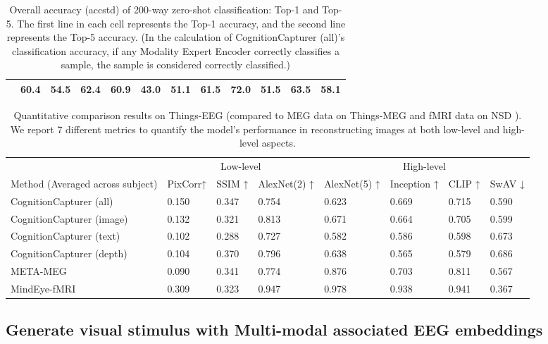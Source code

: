 \documentclass[letterpaper]{article} %
\begin{document}
\begin{table}[ht]
\begin{tabular}{c|ccccccccccc}
 & \textbf{60.4} & 54.5 & 62.4 & 60.9 & 43.0 & 51.1 & \textbf{61.5} & 72.0 & 51.5 & 63.5 & 58.1 \\ \hline
\end{tabular}
\caption{Overall accuracy (acc\textpm std) of 200-way zero-shot classification: Top-1 and Top-5. The first line in each cell represents the Top-1 accuracy, and the second line represents the Top-5 accuracy. (In the calculation of CognitionCapturer (all)'s classification accuracy, if any Modality Expert Encoder correctly classifies a sample, the sample is considered correctly classified.) }
\label{top15results}
\end{table}

\begin{table}[ht]
\centering
\setlength{\tabcolsep}{1mm}
\begin{tabular}{l|lllllll}
\hline
 & \multicolumn{3}{c|}{Low-level} & \multicolumn{4}{c}{High-level} \\ \cline{2-8} 
Method (Averaged across subject) & PixCorr↑ & SSIM ↑ & AlexNet(2) ↑ & AlexNet(5) ↑ & Inception ↑ & CLIP ↑ & SwAV ↓ \\ \hline
CognitionCapturer (all) & 0.150 & 0.347 & 0.754 & 0.623 & 0.669 & 0.715 & 0.590 \\
CognitionCapturer (image) & 0.132 & 0.321 & 0.813 & 0.671 & 0.664 & 0.705 & 0.599 \\
CognitionCapturer (text) & 0.102 & 0.288 & 0.727 & 0.582 & 0.586 & 0.598 & 0.673 \\
CognitionCapturer (depth) & 0.104 & 0.370 & 0.796 & 0.638 & 0.565 & 0.579 & 0.686 \\
META-MEG \citeauthor{benchetrit2024braindecodingrealtimereconstruction}& 0.090 & 0.341 & 0.774 & 0.876 & 0.703 & 0.811 & 0.567 \\
MindEye-fMRI \citeauthor{scotti2024reconstructing}& 0.309& 0.323& 0.947& 0.978& 0.938& 0.941& 0.367\\ \hline
\end{tabular}
\caption{Quantitative comparison results on Things-EEG \cite{gifford2022large}  (compared to MEG data on Things-MEG \cite{hebart2023things} and fMRI data on NSD \cite{allen2022massive}). We report 7 different metrics to quantify the model's performance in reconstructing images at both low-level and high-level aspects.} 
\label{reconresults}
\end{table}

\subsection{Generate visual stimulus with Multi-modal associated EEG embeddings }
\end{document}
